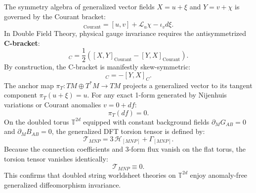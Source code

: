 \documentclass[11pt,a4paper]{article}
\begin{document}
The symmetry algebra of generalized vector fields $X = u + \xi$ and $Y = v + \chi$ is governed by the Courant bracket:
\begin{equation}
    [X, Y]_{\mathrm{Courant}} = [u, v] + \mathcal{L}_u \chi - \iota_v d\xi.
\end{equation}
In Double Field Theory, physical gauge invariance requires the antisymmetrized \textbf{C-bracket}:
\begin{equation}
    [X, Y]_C = \frac{1}{2} \left( [X, Y]_{\mathrm{Courant}} - [Y, X]_{\mathrm{Courant}} \right).
\end{equation}
By construction, the C-bracket is manifestly skew-symmetric:
\begin{equation}
    [X, Y]_C = -[Y, X]_C.
\end{equation}
The anchor map $\pi_T : TM \oplus T^*M \to TM$ projects a generalized vector to its tangent component $\pi_T(u + \xi) = u$. For any exact 1-form generated by Nijenhuis variations or Courant anomalies $v = 0 + d f$:
\begin{equation}
    \pi_T(d f) = 0.
\end{equation}
On the doubled torus $\mathbb{T}^{2d}$ equipped with constant background fields $\partial_M G_{AB} = 0$ and $\partial_M B_{AB} = 0$, the generalized DFT torsion tensor is defined by:
\begin{equation}
    \mathcal{T}_{MNP} = 3 \, \mathcal{H}_{[MNP]} + \Gamma_{[MNP]}.
\end{equation}
Because the connection coefficients and 3-form flux vanish on the flat torus, the torsion tensor vanishes identically:
\begin{equation}
    \mathcal{T}_{MNP} \equiv 0.
\end{equation}
This confirms that doubled string worldsheet theories on $\mathbb{T}^{2d}$ enjoy anomaly-free generalized diffeomorphism invariance.
\end{document}
